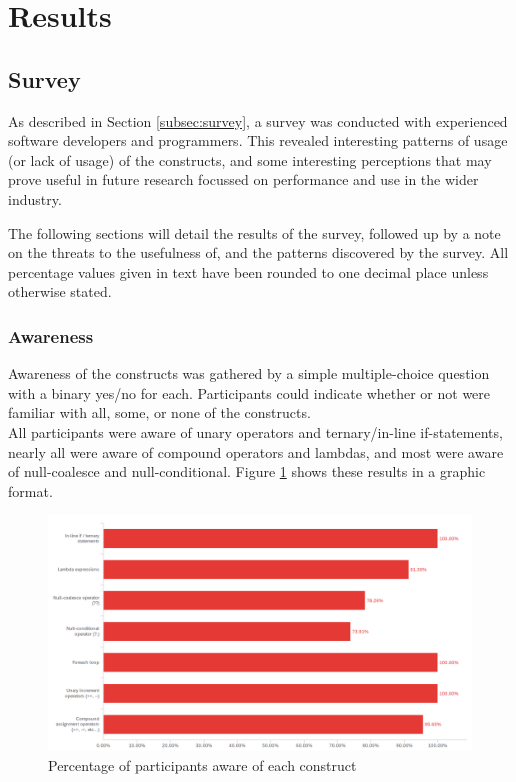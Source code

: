 \documentclass{article}
\begin{document}
\newpage
\section{Results}
    \subsection{Survey}
    \label{subsec:results}
        As described in Section \ref{subsec:survey}, a survey was conducted with experienced software developers and programmers. This revealed interesting patterns of usage (or lack of usage) of the constructs, and some interesting perceptions that may prove useful in future research focussed on performance and use in the wider industry.

        The following sections will detail the results of the survey, followed up by a note on the threats to the usefulness of, and the patterns discovered by the survey. All percentage values given in text have been rounded to one decimal place unless otherwise stated.

        \subsubsection{Awareness}
            Awareness of the constructs was gathered by a simple multiple-choice question with a binary yes/no for each. Participants could indicate whether or not were familiar with all, some, or none of the constructs.
            \\\newline
            All participants were aware of unary operators and ternary/in-line if-statements, nearly all were aware of compound operators and lambdas, and most were aware of null-coalesce and null-conditional. Figure \ref{fig:awareness} shows these results in a graphic format.

            \begin{figure}[htbp]
                \centering
                \includegraphics[width=1.0\textwidth]{awareness}
                \caption{Percentage of participants aware of each construct}
                \label{fig:awareness}
            \end{figure}
\end{document}
